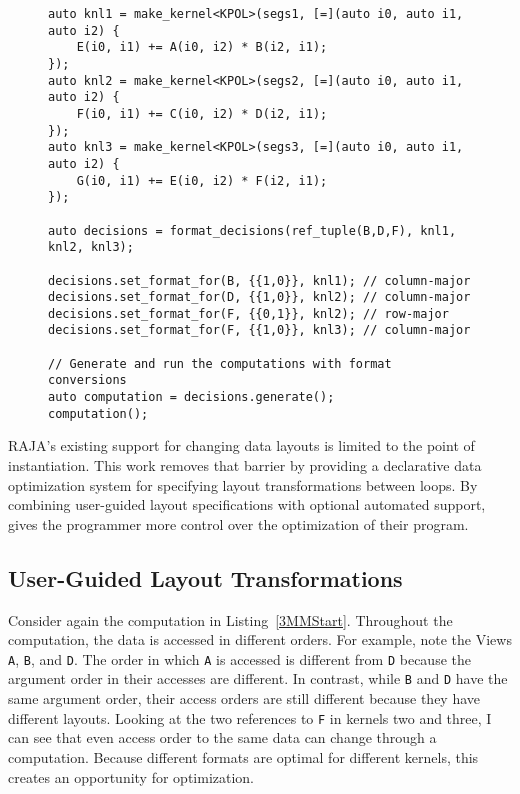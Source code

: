 \begin{figure}
\begin{lstlisting}[caption={Changing data layouts for three Views in the \textsc{3mm} benchmark using \FormatDecisions.},
	label={FormatDecisions3MM}]
auto knl1 = make_kernel<KPOL>(segs1, [=](auto i0, auto i1, auto i2) {
	E(i0, i1) += A(i0, i2) * B(i2, i1);
});
auto knl2 = make_kernel<KPOL>(segs2, [=](auto i0, auto i1, auto i2) {
	F(i0, i1) += C(i0, i2) * D(i2, i1);
});
auto knl3 = make_kernel<KPOL>(segs3, [=](auto i0, auto i1, auto i2) {
	G(i0, i1) += E(i0, i2) * F(i2, i1);
});

auto decisions = format_decisions(ref_tuple(B,D,F), knl1, knl2, knl3);

decisions.set_format_for(B, {{1,0}}, knl1); // column-major
decisions.set_format_for(D, {{1,0}}, knl2); // column-major
decisions.set_format_for(F, {{0,1}}, knl2); // row-major
decisions.set_format_for(F, {{1,0}}, knl3); // column-major

// Generate and run the computations with format conversions
auto computation = decisions.generate();
computation();
\end{lstlisting}
\end{figure}

RAJA's existing support for changing data layouts is limited to the point of instantiation.
This work removes that barrier by providing a declarative data optimization system for specifying layout transformations between loops.
By combining user-guided layout specifications with optional automated support, \FormatDecisions{} gives the programmer more control over the optimization of their program.

\subsection{User-Guided Layout Transformations}

Consider again the computation in Listing~\ref{3MMStart}.
Throughout the computation, the data is accessed in different orders.
For example, note the Views \verb.A., \verb.B., and \verb.D..
The order in which \verb.A. is accessed is different from \verb.D. because the argument order in their accesses are different.
In contrast, while \verb.B. and \verb.D. have the same argument order, their access orders are still different because they have different layouts.
Looking at the two references to \verb.F. in kernels two and three, I can see that even access order to the same data can change through a computation.
Because different formats are optimal for different kernels, this creates an opportunity for optimization. 

